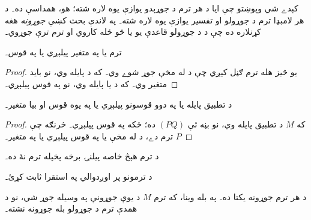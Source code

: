 \documentclass[../../../include/open-logic-section]{subfiles}
\begin{document}

کېدے شي وپوښتو چې ايا د هر ترم د جوړېدو يوازې يوه لاره شته؛ هو،
همداسې ده۔ د هر لامبډا ترم د جوړولو او تفسير يوازې يوه لاره شته۔
په لاندې بحث کښې \emph{جوړونه} هغه کړنلاره ده چې د
 د جوړولو قاعدې يو يا څو ځله کاروي او ترم
ترې جوړوي۔

\begin{lem}
ترم يا په متغير پيلېږي يا په قوس۔
\end{lem}

\begin{proof}
يو څيز هله ترم ګڼل کېږي چې د  له مخې جوړ
شوے وي۔ که د  پايله وي، نو بايد متغير
وي۔ که د  يا
 پايله وي، نو په قوس پيلېږي۔
\end{proof}

\begin{lem}
د تطبيق پايله يا په دوو قوسونو پيلېږي يا په يوه قوس او بيا متغير۔
\end{lem}

\begin{proof}
که $M$ د تطبيق پايله وي، نو بڼه ئې $(PQ)$ ده؛ ځکه په قوس پيلېږي۔
څرنګه چې $P$ ترم دے، د  له مخې يا په قوس
پيلېږي يا په متغير۔
\end{proof}

\begin{lem}
د ترم هېڅ خاصه پيلنۍ برخه پخپله ترم نۀ ده۔
\end{lem}

\begin{prob}
 د ترمونو پر اوږدوالي په استقرا
ثابت کړئ۔
\end{prob}

\begin{prop} 
د هر ترم جوړونه يکتا ده۔ په بله وينا، که ترم $M$ د يوې جوړونې په
وسيله جوړ شي، نو د همدې ترم د جوړولو بله جوړونه نشته۔
\end{prop}
\end{document}

